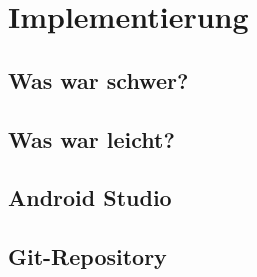 \chapter{Implementierung}
\label{cha:implementierung}


\section{Was war schwer?}


\section{Was war leicht?}


\section{Android Studio}


\section{Git-Repository}

